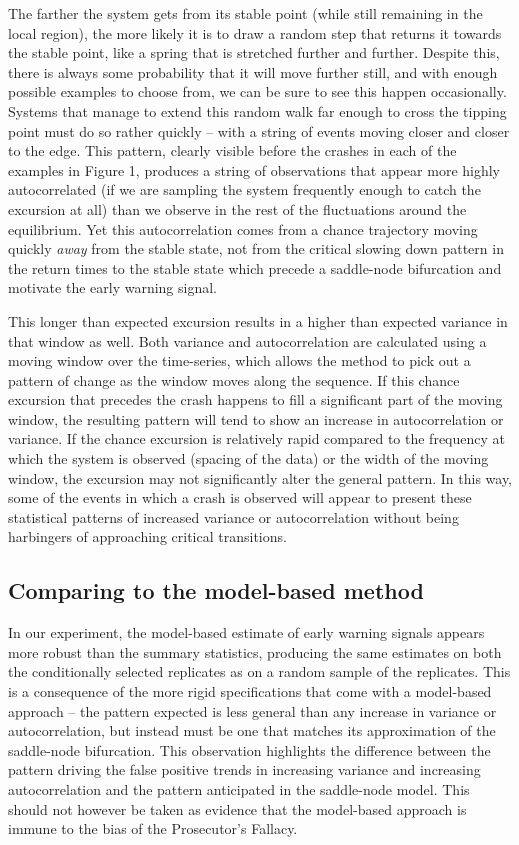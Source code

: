 \documentclass[authoryear,review,12pt]{elsarticle}
\begin{document}
The farther the system gets from its stable point (while still remaining
in the local region), the more likely it is to draw a random step that
returns it towards the stable point, like a spring that is stretched
further and further. Despite this, there is always some probability that
it will move further still, and with enough possible examples to choose
from, we can be sure to see this happen occasionally.  Systems that manage
to extend this random walk far enough to cross the tipping point must do
so rather quickly -- with a string of events moving closer and closer to
the edge.  This pattern, clearly visible before the crashes in each of
the examples in Figure 1, produces a string of observations that appear
more highly autocorrelated (if we are sampling the system frequently
enough to catch the excursion at all) than we observe in the rest of the
fluctuations around the equilibrium.  Yet this autocorrelation comes from
a chance trajectory moving quickly \emph{away} from the stable state,
not from the critical slowing down pattern in the return times to the
stable state which precede a saddle-node bifurcation and motivate the
early warning signal.


This longer than expected excursion results in a higher than expected
variance in that window as well. Both variance and autocorrelation are
calculated using a moving window over the time-series, which allows
the method to pick out a pattern of change as the window moves along
the sequence. If this chance excursion that precedes the crash happens
to fill a significant part of the moving window, the resulting pattern
will tend to show an increase in autocorrelation or variance.  If the
chance excursion is relatively rapid compared to the frequency at which
the system is observed (spacing of the data) or the width of the moving
window, the excursion may not significantly alter the general pattern.
In this way, some of the events in which a crash is observed will
appear to present these statistical patterns of increased variance
or autocorrelation without being harbingers of approaching critical
transitions.


\subsection{Comparing to the model-based method}

In our experiment, the model-based estimate of early warning signals
appears more robust than the summary statistics, producing the same
estimates on both the conditionally selected replicates as on a random 
sample of the replicates.  This is a consequence of the more rigid 
specifications that come with a model-based approach -- the pattern
expected is less general than any increase in variance or autocorrelation,
but instead must be one that matches its approximation of the saddle-node
bifurcation. This observation highlights the difference between the pattern
driving the false positive trends in increasing variance and increasing
autocorrelation and the pattern anticipated in the saddle-node model. This
should not however be taken as evidence that the model-based approach is 
immune to the bias of the Prosecutor's Fallacy. 
\end{document}
